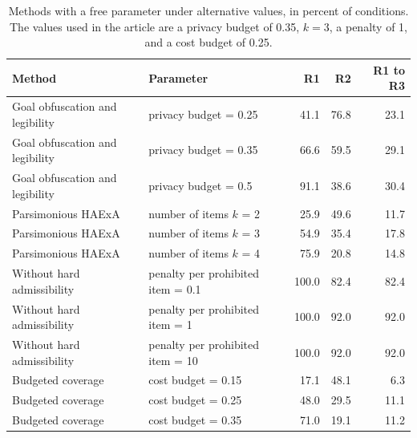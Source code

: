 \begin{table}[!htbp]
\centering
\caption{Methods with a free parameter under alternative values, in percent of conditions. The values used in the article are a privacy budget of 0.35, $k = 3$, a penalty of 1, and a cost budget of 0.25.}
\label{tab:S5-sensitivity}
\footnotesize
\begin{tabular}{@{}llrrr@{}}
\toprule
Method & Parameter & R1 & R2 & R1 to R3 \\
\midrule
Goal obfuscation and legibility & privacy budget = 0.25 & 41.1 & 76.8 & 23.1 \\
Goal obfuscation and legibility & privacy budget = 0.35 & 66.6 & 59.5 & 29.1 \\
Goal obfuscation and legibility & privacy budget = 0.5 & 91.1 & 38.6 & 30.4 \\
\addlinespace
Parsimonious HAExA & number of items $k$ = 2 & 25.9 & 49.6 & 11.7 \\
Parsimonious HAExA & number of items $k$ = 3 & 54.9 & 35.4 & 17.8 \\
Parsimonious HAExA & number of items $k$ = 4 & 75.9 & 20.8 & 14.8 \\
\addlinespace
Without hard admissibility & penalty per prohibited item = 0.1 & 100.0 & 82.4 & 82.4 \\
Without hard admissibility & penalty per prohibited item = 1 & 100.0 & 92.0 & 92.0 \\
Without hard admissibility & penalty per prohibited item = 10 & 100.0 & 92.0 & 92.0 \\
\addlinespace
Budgeted coverage & cost budget = 0.15 & 17.1 & 48.1 & 6.3 \\
Budgeted coverage & cost budget = 0.25 & 48.0 & 29.5 & 11.1 \\
Budgeted coverage & cost budget = 0.35 & 71.0 & 19.1 & 11.2 \\
\bottomrule
\end{tabular}
\end{table}
